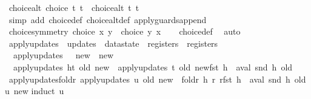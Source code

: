 \begin{isabellebody}
\isanewline
{}\isamarkupfalse%
\ choice{\isacharunderscore}alt{\isacharcolon}\ {\isachardoublequoteopen}choice\ t\ t{\isacharprime}\ {\isacharequal}\ choice{\isacharunderscore}alt\ t\ t{\isacharprime}{\isachardoublequoteclose}\isanewline
%
\isadelimproof
\ \ %
\endisadelimproof
%
\isatagproof
{}\isamarkupfalse%
\ {\isacharparenleft}simp\ add{\isacharcolon}\ choice{\isacharunderscore}def\ choice{\isacharunderscore}alt{\isacharunderscore}def\ apply{\isacharunderscore}guards{\isacharunderscore}append{\isacharparenright}%
\endisatagproof
{\isafoldproof}%
%
\isadelimproof
\isanewline
%
\endisadelimproof
\isanewline
{}\isamarkupfalse%
\ choice{\isacharunderscore}symmetry{\isacharcolon}\ {\isachardoublequoteopen}choice\ x\ y\ {\isacharequal}\ choice\ y\ x{\isachardoublequoteclose}\isanewline
%
\isadelimproof
\ \ %
\endisadelimproof
%
\isatagproof
{}\isamarkupfalse%
\ choice{\isacharunderscore}def\ \isamarkupfalse%
\ auto%
\endisatagproof
{\isafoldproof}%
%
\isadelimproof
\isanewline
%
\endisadelimproof
\isanewline
{}\isamarkupfalse%
\ apply{\isacharunderscore}updates\ {\isacharcolon}{\isacharcolon}\ {\isachardoublequoteopen}updates\ {\isasymRightarrow}\ datastate\ {\isasymRightarrow}\ registers\ {\isasymRightarrow}\ registers{\isachardoublequoteclose}\ \isanewline
\ \ {\isachardoublequoteopen}apply{\isacharunderscore}updates\ {\isacharbrackleft}{\isacharbrackright}\ {\isacharunderscore}\ new\ {\isacharequal}\ new{\isachardoublequoteclose}\ {\isacharbar}\isanewline
\ \ {\isachardoublequoteopen}apply{\isacharunderscore}updates\ {\isacharparenleft}h{\isacharhash}t{\isacharparenright}\ old\ new\ {\isacharequal}\ {\isacharparenleft}apply{\isacharunderscore}updates\ t\ old\ new{\isacharparenright}{\isacharparenleft}fst\ h\ {\isachardollar}{\isacharcolon}{\isacharequal}\ aval\ {\isacharparenleft}snd\ h{\isacharparenright}\ old{\isacharparenright}{\isachardoublequoteclose}\isanewline
\isanewline
{}\isamarkupfalse%
\ apply{\isacharunderscore}updates{\isacharunderscore}foldr{\isacharcolon}\ {\isachardoublequoteopen}apply{\isacharunderscore}updates\ u\ old\ new\ {\isacharequal}\ foldr\ {\isacharparenleft}{\isasymlambda}h\ r{\isachardot}\ r{\isacharparenleft}fst\ h\ {\isachardollar}{\isacharcolon}{\isacharequal}\ aval\ {\isacharparenleft}snd\ h{\isacharparenright}\ old{\isacharparenright}{\isacharparenright}\ u\ new{\isachardoublequoteclose}\isanewline
%
\isadelimproof
%
\endisadelimproof
%
\isatagproof
{}\isamarkupfalse%
{\isacharparenleft}induct\ u{\isacharparenright}\isanewline

\end{isabellebody}
